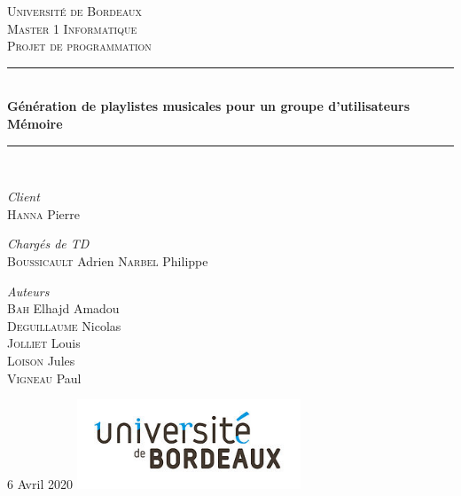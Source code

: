 \documentclass{article}
\begin{document}
\begin{titlepage}
	\newcommand{\HRule}{\rule{\linewidth}{0.5mm}}
					
	\center
					
	\textsc{\LARGE Université de Bordeaux}\\[1.5cm]
					
	\textsc{\Large Master 1 Informatique}\\[0.5cm]
					
	\textsc{\large Projet de programmation}\\[0.5cm]
					
	\HRule\\[0.4cm]
					
	{\huge\bfseries Génération de playlistes musicales pour un groupe d'utilisateurs}\\[0.4cm]
	{\huge\bfseries Mémoire}
	\HRule\\[1.5cm]
					
	\begin{minipage}{0.4\textwidth}
			
		\begin{flushleft}
			\large
			\textit{Client}\\
			\textsc{Hanna}  Pierre 
		\end{flushleft}
				
		\begin{flushleft}
			\large
			\textit{Chargés de TD}\\
			\textsc{Boussicault}  Adrien 
			\textsc{Narbel}  Philippe 
		\end{flushleft}
				
		\begin{flushleft}
			\large
			\textit{Auteurs}\\
			\textsc{Bah} Elhajd Amadou
			\\
			\textsc{Deguillaume} Nicolas
			\\
			\textsc{Jolliet} Louis
			\\
			\textsc{Loison} Jules 
			\\
			\textsc{Vigneau} Paul 
		\end{flushleft}
				
	\end{minipage}
	\vfill\vfill\vfill
					
	{\large 6 Avril 2020}
	\vfill\vfill
	\includegraphics[width=0.5\textwidth]{ressources/Logo.jpg}\\[1cm]
		\vfill
		\end{titlepage}
		\justify
		\renewcommand{\contentsname}{Table des matières}
		\tableofcontents
		\newpage
								
\end{document}

